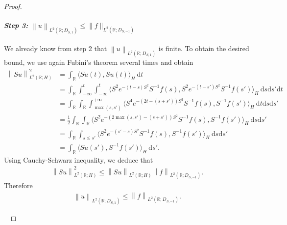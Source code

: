 \documentclass[10pt,a4paper]{amsart}
\begin{document}
\begin{proof}
\

\paragraph{\textit{Step 3:  $\left\|u \right\|_{L^2(\mathbb{R}; D_{S,1})} \le  \|f\|_{L^2(\mathbb{R};D_{S,-1})}$}} We already know from step 2 that $\left\|u \right\|_{L^2(\mathbb{R}; D_{S,1})}$ is finite. To obtain the desired bound, we use again Fubini's theorem several times and obtain 
\begin{align*}
    \left\|Su \right\|_{L^2(\mathbb{R};H)}^2&
    =\int_{\mathbb{R}} \langle  Su(t) , Su(t) \rangle_H \ \mathrm{d} t 
    \\
    &
    = \int_{\mathbb{R}} \int_{-\infty}^{t}\int_{-\infty}^{t} \langle  S^2 e^{-(t-s)S^2}S^{-1}f(s) , S^2 e^{-(t-s')S^2}S^{-1}f(s')\rangle_H \ \mathrm{d} s  \mathrm{d} s'  \mathrm{d} t  \\ 
    &
    = \int_{\mathbb{R}} \int_{\mathbb{R}}\int_{\max(s,s')}^{+\infty} \langle  S^4 e^{-(2t-(s+s'))S^2}S^{-1}f(s) ,  S^{-1}f(s')\rangle_H \ \mathrm{d} t  \mathrm{d} s  \mathrm{d} s'\\
    & = \frac{1}{2} \int_{\mathbb{R}} \int_{\mathbb{R}} \langle  S^2 e^{-(2\max(s,s')-(s+s'))S^2}S^{-1}f(s) , S^{-1}f(s')\rangle_H  \ \mathrm{d} s  \mathrm{d} s'\\
    &=  \int_{\mathbb{R}} \int_{s\leq s'} \langle  S^2 e^{-(s'-s)S^2}S^{-1}f(s) , S^{-1}f(s')\rangle_H  \ \mathrm{d} s  \mathrm{d} s'\\
    &=  \int_{\mathbb{R}} \langle  Su(s') , S^{-1}f(s')\rangle_H \ \mathrm{d} s'.
\end{align*}
Using Cauchy-Schwarz inequality, we deduce that
\begin{align*}
     \left\|Su \right\|_{L^2(\mathbb{R};H)}^2 \leq  \left\|Su \right\|_{L^2(\mathbb{R};H)}  \left\|f \right\|_{L^2(\mathbb{R};D_{S,-1})}.
\end{align*}
Therefore 
\begin{align*}
     \left\|u \right\|_{L^2(\mathbb{R};D_{S,1})} \leq   \left\|f \right\|_{L^2(\mathbb{R};D_{S,-1})}.
\end{align*}

\


\end{proof}
\end{document}
